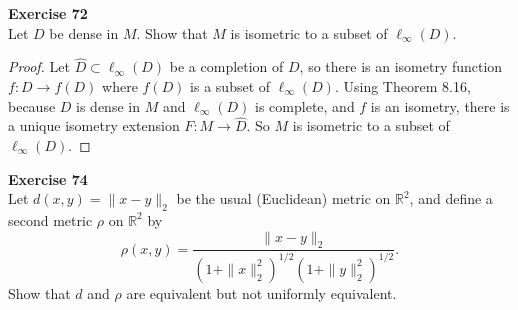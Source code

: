 \documentclass[12pt, a4paper]{article}
\theoremstyle{plain}
\newcommand{\R}{\mathbb{R}}
\newenvironment{exercise}[2][Exercise]
    { \begin{mdframed}[backgroundcolor=gray!20] \textbf{#1 #2} \\}
    {  \end{mdframed}}
\begin{document}
\begin{exercise}{72}
Let $D$ be dense in $M$. Show that $M$ is isometric to a subset of $\ell_\infty(D)$.
\end{exercise}
	\begin{proof}
	Let $\hat{D}\subset \ell_\infty(D)$ be a completion of $D$, so there is an isometry function $f:D\rightarrow f(D)$ where $f(D)$ is a subset of $\ell_\infty(D)$. Using Theorem 8.16, because $D$ is dense in $M$ and $\ell_\infty(D)$ is complete, and $f$ is an isometry, there is a unique isometry extension $F:M\rightarrow \hat{D}$. So $M$ is isometric to a subset of $\ell_\infty(D)$. 
	\end{proof}
	
\begin{exercise}{74}
Let $d(x,y)=\|x-y\|_2$ be the usual (Euclidean) metric on $\R^2$, and define a second metric $\rho$ on $\R^2$ by
\[
\rho(x,y)=\frac{\|x-y\|_2}{(1+\|x\|_2^2)^{1/2}(1+\|y\|_2^2)^{1/2}}.
\]
Show that $d$ and $\rho$ are equivalent but not uniformly equivalent.
\end{exercise}
\end{document}
